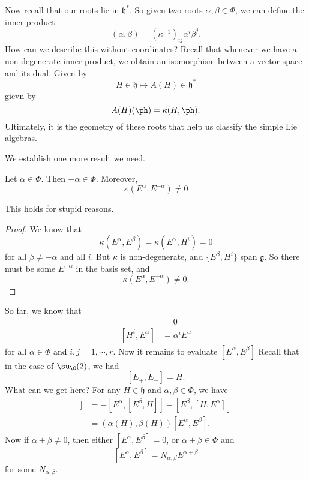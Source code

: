 \documentclass[a4paper]{article}
\begin{document}
Now recall that our roots lie in $\mathfrak{h}^*$. So given two roots $\alpha, \beta \in \Phi$, we can define the inner product
\[
  (\alpha, \beta) = (\kappa^{-1})_{ij} \alpha^i \beta^j.
\]
How can we describe this without coordinates? Recall that whenever we have a non-degenerate inner product, we obtain an isomorphism between a vector space and its dual. Given by
\[
  H \in \mathfrak{h} \mapsto A(H) \in \mathfrak{h}^*
\]
gievn by
\[
  A(H)(\ph) = \kappa(H, \ph).
\]
Ultimately, it is the geometry of these roots that help us classify the simple Lie algebras.

We establish one more result we need.
\begin{lemma}
  Let $\alpha \in \Phi$. Then $-\alpha \in \Phi$. Moreover,
  \[
    \kappa(E^\alpha, E^{-\alpha}) \not= 0
  \]
\end{lemma}
This holds for stupid reasons.

\begin{proof}
  We know that
  \[
    \kappa(E^\alpha, E^\beta) = \kappa(E^\alpha, H^i) = 0
  \]
  for all $\beta \not= -\alpha$ and all $i$. But $\kappa$ is non-degenerate, and $\{E^\beta, H^i\}$ span $\mathfrak{g}$. So there must be some $E^{-\alpha}$ in the basis set, and
  \[
    \kappa(E^\alpha, E^{-\alpha}) \not= 0.
  \]
\end{proof}

So far, we know that
\begin{align*}
  [H^i, H^j] &= 0\\
  [H^i, E^\alpha] &= \alpha^i E^\alpha
\end{align*}
for all $\alpha \in \Phi$ and $i, j = 1, \cdots, r$. Now it remains to evaluate $[E^\alpha, E^\beta]$ Recall that in the case of $\su_\C(2)$, we had
\[
  [E_+, E_-] = H.
\]
What can we get here? For any $H \in \mathfrak{h}$ and $\alpha, \beta \in \Phi$, we have
\begin{align*}
  [H, [E^\alpha, E^\beta]] &= -[E^\alpha, [E^\beta, H]] - [E^\beta, [H, E^\alpha]]\\
  &= (\alpha(H), \beta(H))[E^\alpha, E^\beta].
\end{align*}
Now if $\alpha + \beta \not= 0$, then either $[E^\alpha, E^\beta] = 0$, or $\alpha + \beta \in \Phi$ and
\[
  [E^\alpha, E^\beta] = N_{\alpha, \beta} E^{\alpha + \beta}
\]
for some $N_{\alpha, \beta}$.
\end{document}
